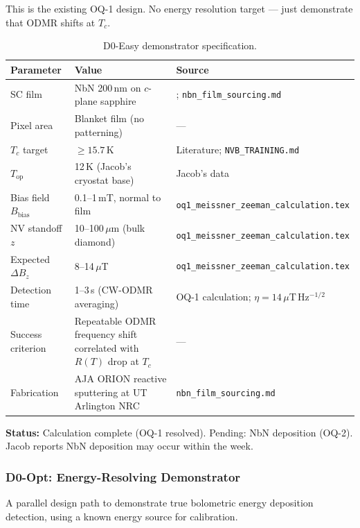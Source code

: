 This is the existing OQ-1 design. No energy resolution target --- just demonstrate
that ODMR shifts at $T_c$.

\begin{table}[ht]
\centering
\caption{D0-Easy demonstrator specification.}
\label{tab:q6_d0easy}
\small
\begin{tabular}{@{}lll@{}}
\toprule
Parameter & Value & Source \\
\midrule
SC film & NbN 200\,nm on $c$-plane sapphire
  & \cite{Kamlapure2010}; \texttt{nbn\_film\_sourcing.md} \\
Pixel area & Blanket film (no patterning) & --- \\
$T_c$ target & $\geq 15.7$\,K & Literature; \texttt{NVB\_TRAINING.md} \\
$T_\mathrm{op}$ & 12\,K (Jacob's cryostat base) & Jacob's data \\
Bias field $B_\mathrm{bias}$ & 0.1--1\,mT, normal to film
  & \texttt{oq1\_meissner\_zeeman\_calculation.tex} \\
NV standoff $z$ & 10--100\,$\mu$m (bulk diamond)
  & \texttt{oq1\_meissner\_zeeman\_calculation.tex} \\
Expected $\Delta B_z$ & 8--14\,$\mu$T
  & \texttt{oq1\_meissner\_zeeman\_calculation.tex} \\
Detection time & 1--3\,s (CW-ODMR averaging)
  & OQ-1 calculation; $\eta = 14\,\mu$T\,Hz$^{-1/2}$ \\
Success criterion & Repeatable ODMR frequency shift correlated with $R(T)$ drop at $T_c$
  & --- \\
Fabrication & AJA ORION reactive sputtering at UT Arlington NRC
  & \texttt{nbn\_film\_sourcing.md} \\
\bottomrule
\end{tabular}
\end{table}

\textbf{Status:} Calculation complete (OQ-1 resolved). Pending: NbN deposition (OQ-2).
Jacob reports NbN deposition may occur within the week.

\subsubsection{D0-Opt: Energy-Resolving Demonstrator}
\label{sec:q6_d0opt}

A parallel design path to demonstrate true bolometric energy deposition detection,
using a known energy source for calibration.

